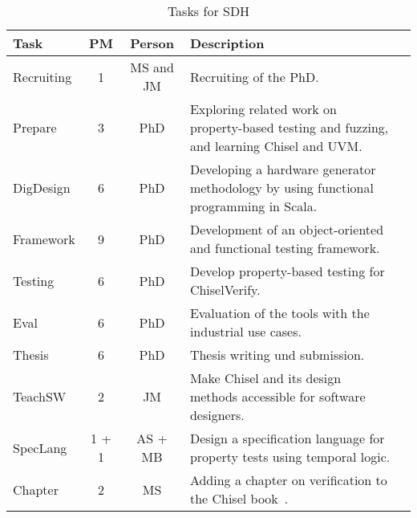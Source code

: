 \documentclass[fleqn,12pt]{article}
\begin{document}
\begin{table*}%
{\small
  \begin{center}
    \begin{tabular}{lccp{110mm}l}
      \toprule
      Task                   & PM  & Person    & Description                                                                                   \\
      \midrule
      Recruiting             & 1   & MS and JM & Recruiting of the PhD.                                                                    \\
      \midrule
      Prepare                & 3   & PhD      & Exploring related work on property-based testing and fuzzing, and learning Chisel and UVM.                           \\
      DigDesign               & 6   & PhD      & Developing a hardware generator methodology by using functional programming in Scala.         \\
      Framework              & 9   & PhD      & Development of an object-oriented and functional testing framework.                      \\
      Testing & 6   & PhD      & Develop property-based testing for ChiselVerify.                                                      \\
      Eval                   & 6 & PhD    & Evaluation of the tools with the industrial use cases.                                                     \\
      Thesis                 & 6   & PhD    & Thesis writing und submission.                                                                \\
      \midrule
      TeachSW                 &  2  & JM            & Make Chisel and its design methods accessible for software designers. \\
      SpecLang                &    1 + 1   &  AS + MB & Design a specification language for property tests using temporal logic. \\
      Chapter                & 2   & MS        & Adding a chapter on verification to the Chisel book~\cite{chisel:book}.                       \\
      \bottomrule
    \end{tabular}
  \end{center}
  \caption{Tasks for SDH}\label{tab:packages}
}
\end{table*}
\end{document}

